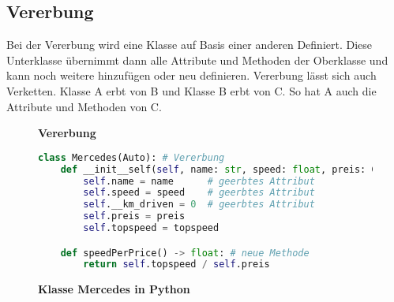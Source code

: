 \subsection{Vererbung}

Bei der Vererbung wird eine Klasse auf Basis einer anderen Definiert.
Diese Unterklasse übernimmt dann alle Attribute und Methoden der Oberklasse
und kann noch weitere hinzufügen oder neu definieren. Vererbung lässt sich auch
Verketten. Klasse A erbt von B und Klasse B erbt von C. So hat A auch die Attribute
und Methoden von C.


\vspace*{0.5cm}
\begin{figure}[H]
\begin{center}
    \caption{\textbf{Vererbung}}
\end{center}
\end{figure}

\begin{figure}
\begin{lstlisting}[language=python]
class Mercedes(Auto): # Vererbung
    def __init__self(self, name: str, speed: float, preis: Ganzahl, topspeed: Dezimalzahl):
        self.name = name      # geerbtes Attribut
        self.speed = speed    # geerbtes Attribut
        self.__km_driven = 0  # geerbtes Attribut
        self.preis = preis
        self.topspeed = topspeed

    def speedPerPrice() -> float: # neue Methode
        return self.topspeed / self.preis
\end{lstlisting}
\caption{\textbf{Klasse Mercedes in Python}}
\end{figure}

